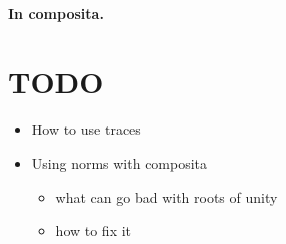 \documentclass[a4paper,11pt]{article}
\begin{document}
\paragraph{In composita.}



\section{TODO}
\begin{itemize}
  \item How to use traces
  \item Using norms with composita
    \begin{itemize}
      \item what can go bad with roots of unity
      \item how to fix it
    \end{itemize}
\end{itemize}
\end{document}
